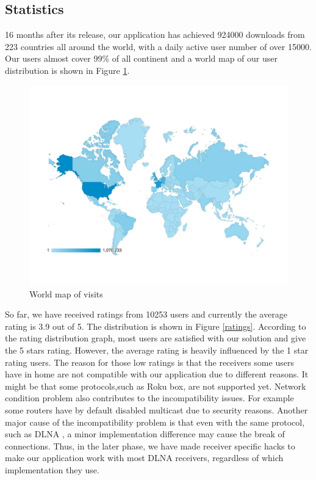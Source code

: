 \subsection{Statistics\label{4_2}}
16 months after its release, our application has achieved 924000 downloads from 223 countries all around the world, with a daily active user number of over 15000. Our users almost cover 99\% of all continent and a world map of our user distribution is shown in Figure \ref{user_map}. 
\begin{figure}[hb]
\centering \includegraphics[width=0.9\columnwidth]{charts/session_world_map}
\caption{World map of visits \label{user_map}}
\end{figure}
So far, we have received ratings from 10253 users and currently the average rating is 3.9 out of 5. The distribution is shown in Figure \ref{ratings}. According to the rating distribution graph, most users are satisfied with our solution and give the 5 stars rating. However, the average rating is heavily influenced by the 1 star rating users. The reason for those low ratings is that the receivers some users have in home are not compatible with our application due to different reasons. It might be that some protocols,such as Roku box, are not supported yet. Network condition problem also contributes to the incompatibility issues. For example some routers have by default disabled multicast due to security reasons. Another major cause of the incompatibility problem is that even with the same protocol, such as DLNA , a minor implementation difference may cause the break of connections. Thus, in the later phase, we have made receiver specific hacks to make our application work with most DLNA receivers, regardless of which implementation they use.
